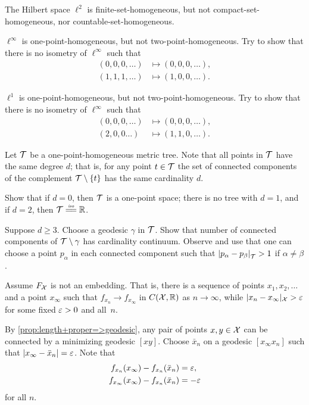 The Hilbert space $\ell^2$ is finite-set-homogeneous, but not compact-set-homogeneous, nor countable-set-homogeneous.

$\ell^\infty$ is one-point-homogeneous, but not two-point-homogeneous.
Try to show that there is no isometry of $\ell^\infty$ such that
\begin{align*}
(0,0,0,\dots)&\mapsto (0,0,0,\dots),
\\
(1,1,1,\dots)&\mapsto (1,0,0,\dots).
\end{align*}

$\ell^1$ is one-point-homogeneous, but not two-point-homogeneous.
Try to show that there is no isometry of $\ell^\infty$ such that
\begin{align*}
(0,0,0,\dots)&\mapsto (0,0,0,\dots),
\\
(2,0,0\dots)&\mapsto (1,1,0,\dots).
\end{align*}

Let $\mathcal{T}$ be a one-point-homogeneous metric tree.
Note that all points in $\mathcal{T}$ have the same degree $d$;
that is, for any point $t\in \mathcal{T}$ the set of connected components of the complement $\mathcal{T}\setminus\{t\}$ has the same cardinality $d$.

Show that if $d=0$, then $\mathcal{T}$ is a one-point space;
there is no tree with $d=1$,
and if $d=2$, then $\spc{T}\iso\RR$.

Suppose $d\ge 3$.
Choose a geodesic $\gamma$ in $\mathcal{T}$.
Show that number of connected components of $\mathcal{T}\setminus\gamma$ has cardinality continuum.
Observe and use that one can choose a point $p_\alpha$ in each connected component such that $\dist{p_\alpha}{p_\beta}{\spc{T}}>1$ if $\alpha\ne\beta$.

Assume $F_{\mathcal{X}}$ is not an embedding.
That is, there is a sequence of points $x_1,x_2,\dots$ 
and a point $x_\infty$ such that $f_{x_n}\to f_{x_\infty}$ in $C(\mathcal{X},\mathbb{R})$
as $n\to \infty$, 
while $|x_n-x_\infty|_{\mathcal{X}}>\varepsilon$ 
for some fixed $\varepsilon>0$ and all~$n$.

By \ref{prop:length+proper=>geodesic}, any pair of points $x,y\in \mathcal{X}$ can be connected by a minimizing geodesic $[xy]$.
Choose $\bar x_n$ on a geodesic $[x_\infty x_n]$ such that $|x_\infty-\bar x_n|=\varepsilon$.
Note that 
\begin{align*}
f_{x_n}(x_\infty)-f_{x_n}(\bar x_n)&=\varepsilon,
\\
f_{x_\infty}(x_\infty)-f_{x_n}(\bar x_n)&=-\varepsilon
\end{align*}
for all $n$.

